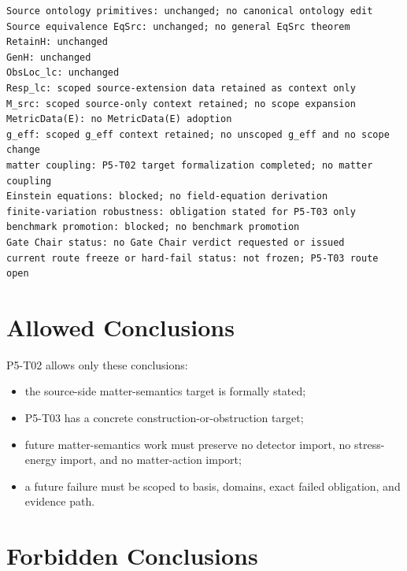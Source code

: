 \documentclass[11pt]{article}
\begin{document}
\begin{verbatim}
Source ontology primitives: unchanged; no canonical ontology edit
Source equivalence EqSrc: unchanged; no general EqSrc theorem
RetainH: unchanged
GenH: unchanged
ObsLoc_lc: unchanged
Resp_lc: scoped source-extension data retained as context only
M_src: scoped source-only context retained; no scope expansion
MetricData(E): no MetricData(E) adoption
g_eff: scoped g_eff context retained; no unscoped g_eff and no scope change
matter coupling: P5-T02 target formalization completed; no matter coupling
Einstein equations: blocked; no field-equation derivation
finite-variation robustness: obligation stated for P5-T03 only
benchmark promotion: blocked; no benchmark promotion
Gate Chair status: no Gate Chair verdict requested or issued
current route freeze or hard-fail status: not frozen; P5-T03 route open
\end{verbatim}

\section{Allowed Conclusions}

P5-T02 allows only these conclusions:
\begin{itemize}[leftmargin=*]
\item the source-side matter-semantics target is formally stated;
\item P5-T03 has a concrete construction-or-obstruction target;
\item future matter-semantics work must preserve no detector import, no
  stress-energy import, and no matter-action import;
\item a future failure must be scoped to basis, domains, exact failed
  obligation, and evidence path.
\end{itemize}

\section{Forbidden Conclusions}
\end{document}
